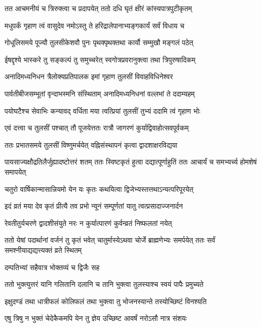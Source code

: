 \twolineshloka
{तत आचमनीयं च त्रिरुक्त्वा च प्रदापयेत्}
{ततो दधि घृतं क्षीरं कांस्यपात्रपुटीकृतम्} %

\twolineshloka
{मधुपर्कं गृहाण त्वं वासुदेव नमोऽस्तु ते}
{हरिद्रालेपानाभ्यङ्गकार्यं सर्वं विधाय च} %

\twolineshloka
{गोधूलिसमये पूज्यौ तुलसीकेशवौ पुनः}
{पृथक्पृथक्तथा कार्यौ सम्मुखौ मङ्गलं पठेत्} %

\twolineshloka
{ईषद्दृश्ये भास्करे तु सङ्कल्पं तु समुच्चरेत्}
{स्वगोत्रप्रवरानुक्त्वा तथा त्रिपुरुषादिकम्} %

\twolineshloka
{अनादिमध्यनिधन त्रैलोक्यप्रतिपालक}
{इमां गृहाण तुलसीं विवाहविधिनेश्वर} %

\twolineshloka
{पार्वतीबीजसम्भूतां वृन्दाभस्मनि संस्थिताम्}
{अनादिमध्यनिधनां वल्लभां ते ददाम्यहम्} %

\twolineshloka
{पयोघटैश्च सेवाभिः कन्यावद् वर्धिता मया}
{त्वत्प्रियां तुलसीं तुभ्यं ददामि त्वं गृहाण भोः} %

\twolineshloka
{एवं दत्त्वा च तुलसीं पश्चात् तौ पूजयेत्ततः}
{रात्रौ जागरणं कुर्याद्विवाहोत्सवपूर्वकम्} %

\twolineshloka
{ततः प्रभातसमये तुलसीं विष्णुमर्चयेत्}
{वह्निसंस्थापनं कृत्वा द्वादशाक्षरविद्यया} %

\threelineshloka
{पायसाज्यक्षौद्रतिलैर्जुह्यादष्टोत्तरं शतम्}
{ततः स्विष्टकृतं हुत्वा दद्यात्पूर्णाहुतिं ततः}
{आचार्यं च समभ्यर्च्य होमशेषं समापयेत्} %

\twolineshloka
{चतुरो वार्षिकान्मासान्नियमो येन यः कृतः}
{कथयित्वा द्विजेभ्यस्तत्तथाऽन्यत्परिपूरयेत्} %

\twolineshloka
{इदं व्रतं मया देव कृतं प्रीत्यै तव प्रभो}
{न्यूनं सम्पूर्णतां यातु त्वत्प्रसादाज्जनार्दन} %

\twolineshloka
{रेवतीतुर्यचरणे द्वादशीसंयुते नरः}
{न कुर्यात्पारणं कुर्वन्व्रतं निष्फलतां नयेत्} %

\threelineshloka
{ततो येषां पदार्थानां वर्जनं तु कृतं भवेत्}
{चातुर्मास्येऽथवा चोर्जे ब्राह्मणेभ्यः समर्पयेत्}
{ततः सर्वं समश्नीयाद्यद्यत्त्यक्तं व्रते स्थितम्} %


\onelineshloka
{दम्पतिभ्यां सहैवात्र भोक्तव्यं च द्विजैः सह} %

\twolineshloka
{ततो भुक्त्युत्तरं यानि गलितानि दलानि च}
{तानि भुक्त्वा तुलस्याश्च स्वयं पापैः प्रमुच्यते} %

\twolineshloka
{इक्षुदण्डं तथा धात्रीफलं कोलिफलं तथा}
{भुक्त्वा तु भोजनस्यान्ते तस्योच्छिष्टं विनश्यति} %

\twolineshloka
{एषु त्रिषु न भुक्तं चेदेकैकमपि येन तु}
{ज्ञेय उच्छिष्ट आवर्षं नरोऽसौ नात्र संशयः} %

